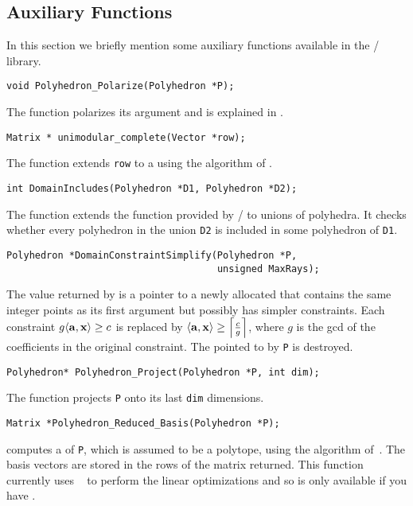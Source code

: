 \subsection{Auxiliary Functions}

In this section we briefly mention some auxiliary functions
available in the \barvinok/ library.

\begin{verbatim}
void Polyhedron_Polarize(Polyhedron *P);
\end{verbatim}
The function  
polarizes its argument and is explained
in .

\begin{verbatim}
Matrix * unimodular_complete(Vector *row);
\end{verbatim}
The function  extends
\verb+row+ to a  using the
algorithm of .

\begin{verbatim}
int DomainIncludes(Polyhedron *D1, Polyhedron *D2);
\end{verbatim}
The function  extends
the function 
provided by \PolyLib/ 
to unions of polyhedra.
It checks whether every polyhedron in the union {\tt D2}
is included in some polyhedron of {\tt D1}.

\begin{verbatim}
Polyhedron *DomainConstraintSimplify(Polyhedron *P, 
                                     unsigned MaxRays);
\end{verbatim}
The value returned by
 is a pointer to
a newly allocated  that contains the 
same integer points as its first argument but possibly
has simpler constraints.
Each constraint $ g \sp a x \ge c $
is replaced by $ \sp a x \ge \ceil{ \frac c g } $,
where $g$ is the \ac{gcd} of the coefficients in the original
constraint.
The  pointed to by \verb+P+ is destroyed.

\begin{verbatim}
Polyhedron* Polyhedron_Project(Polyhedron *P, int dim);
\end{verbatim}
The function  projects
\verb+P+ onto its last \verb+dim+ dimensions.

\begin{verbatim}
Matrix *Polyhedron_Reduced_Basis(Polyhedron *P);
\end{verbatim}
 computes
a  of {\tt P}, which
is assumed to be a polytope, using the algorithm
of~.
The basis vectors are stored in the rows of the matrix returned.
This function currently uses ~
to perform the linear optimizations and so is only available
if you have .

